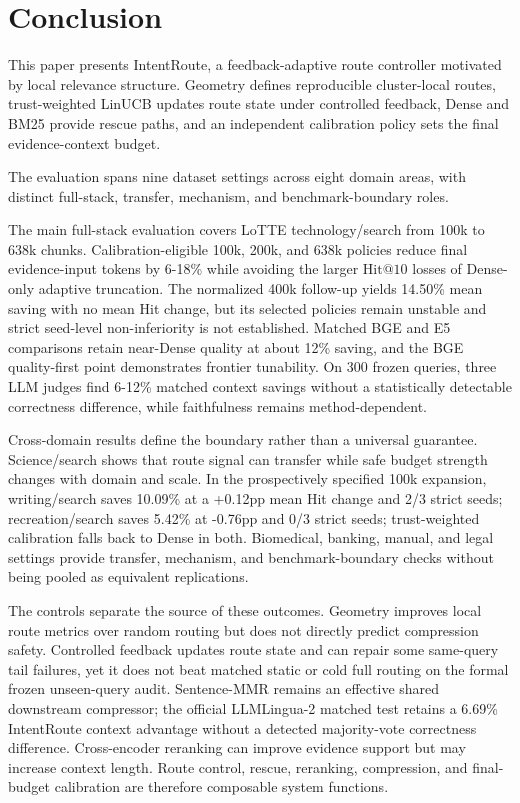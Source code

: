 
\section{Conclusion}
\label{sec:09-conclusion:conclusion}

This paper presents IntentRoute, a feedback-adaptive route controller motivated by local relevance structure. Geometry defines reproducible cluster-local routes, trust-weighted LinUCB updates route state under controlled feedback, Dense and BM25 provide rescue paths, and an independent calibration policy sets the final evidence-context budget.

The evaluation spans nine dataset settings across eight domain areas, with distinct full-stack, transfer, mechanism, and benchmark-boundary roles.

The main full-stack evaluation covers LoTTE technology/search from 100k to 638k chunks. Calibration-eligible 100k, 200k, and 638k policies reduce final evidence-input tokens by 6-18\% while avoiding the larger $\mathrm{Hit@10}$ losses of Dense-only adaptive truncation. The normalized 400k follow-up yields 14.50\% mean saving with no mean Hit change, but its selected policies remain unstable and strict seed-level non-inferiority is not established. Matched BGE and E5 comparisons retain near-Dense quality at about 12\% saving, and the BGE quality-first point demonstrates frontier tunability. On 300 frozen queries, three LLM judges find 6-12\% matched context savings without a statistically detectable correctness difference, while faithfulness remains method-dependent.

Cross-domain results define the boundary rather than a universal guarantee. Science/search shows that route signal can transfer while safe budget strength changes with domain and scale. In the prospectively specified 100k expansion, writing/search saves 10.09\% at a +0.12pp mean Hit change and 2/3 strict seeds; recreation/search saves 5.42\% at -0.76pp and 0/3 strict seeds; trust-weighted calibration falls back to Dense in both. Biomedical, banking, manual, and legal settings provide transfer, mechanism, and benchmark-boundary checks without being pooled as equivalent replications.

The controls separate the source of these outcomes. Geometry improves local route metrics over random routing but does not directly predict compression safety. Controlled feedback updates route state and can repair some same-query tail failures, yet it does not beat matched static or cold full routing on the formal frozen unseen-query audit. Sentence-MMR remains an effective shared downstream compressor; the official LLMLingua-2 matched test retains a 6.69\% IntentRoute context advantage without a detected majority-vote correctness difference. Cross-encoder reranking can improve evidence support but may increase context length. Route control, rescue, reranking, compression, and final-budget calibration are therefore composable system functions.

